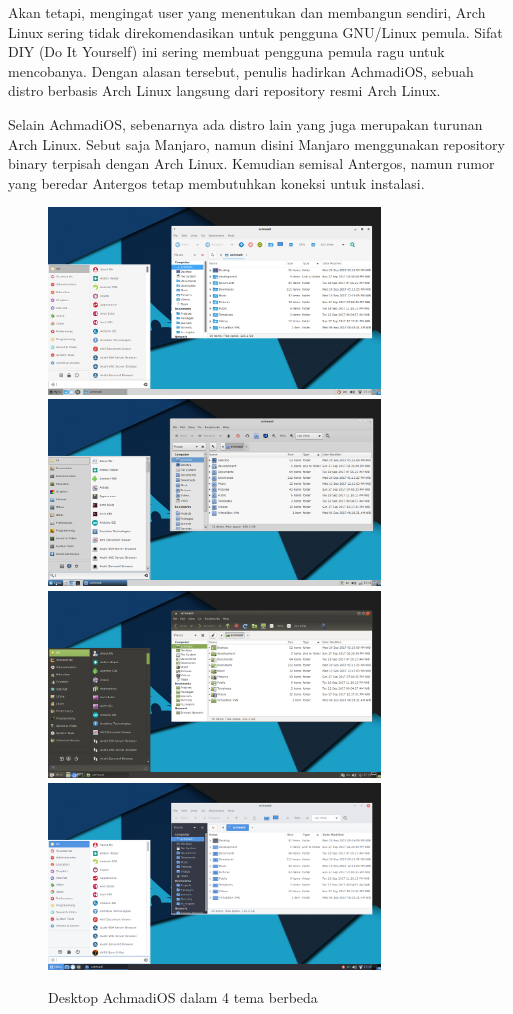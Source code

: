 \documentclass[12pt,]{article}
\begin{document}
	Akan tetapi, mengingat user yang menentukan dan membangun sendiri, Arch Linux sering tidak direkomendasikan untuk pengguna GNU/Linux pemula.
	Sifat DIY (Do It Yourself) ini sering membuat pengguna pemula ragu untuk mencobanya.
	Dengan alasan tersebut, penulis hadirkan AchmadiOS, sebuah distro berbasis Arch Linux langsung dari repository resmi Arch Linux.

	Selain AchmadiOS, sebenarnya ada distro lain yang juga merupakan turunan Arch Linux.
	Sebut saja Manjaro, namun disini Manjaro menggunakan repository binary terpisah dengan Arch Linux.
	Kemudian semisal Antergos, namun rumor yang beredar Antergos tetap membutuhkan koneksi untuk instalasi.
	
	\begin{figure}[h]
		\centering
		\includegraphics[width=250pt]{png/tema_1}
		\includegraphics[width=250pt]{png/tema_2}
		\includegraphics[width=250pt]{png/tema_3}
		\includegraphics[width=250pt]{png/tema_4}
		\caption{Desktop AchmadiOS dalam 4 tema berbeda}
	\end{figure}
\end{document}
